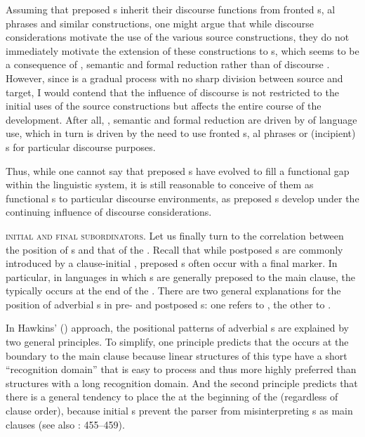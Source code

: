 \documentclass[output=paper]{langsci/langscibook}
\begin{document}
Assuming that preposed s inherit their discourse functions from fronted s, al phrases and similar constructions, one might argue that while discourse considerations motivate the use of the various source constructions, they do not immediately motivate the extension of these constructions to s, which 
\label{p:xxx:automatization}
seems to be a consequence of , semantic  and formal reduction rather than of discourse . However, since  is a gradual process with no sharp division between source and target, I would contend that the influence of discourse is not restricted to the initial uses of the source constructions but affects the entire course of the development. After all, , semantic  and formal reduction are driven by  of language use, which in turn is driven by the need to use fronted s, al phrases or (incipient) s for particular discourse purposes.

Thus, while one cannot say that preposed s have evolved to fill a functional gap within the linguistic system, it is still reasonable to conceive of them as functional s to particular discourse environments, as preposed s develop under the continuing influence of discourse considerations.

\textsc{initial} \textsc{and} \textsc{final} \textsc{subordinators}. Let us finally turn to the correlation between the position of s and that of the . Recall that while postposed s are commonly introduced by a clause-initial , preposed s often occur with a final marker. In particular, in languages in which s are generally preposed to the main clause, the  typically occurs at the end of the . There are two general explanations for the position of adverbial s in pre- and postposed s: one refers to , the other to .


In Hawkins’ (\citeyear{Hawkins1994,Hawkins2004})  approach, the positional patterns of adverbial s are explained by two general principles. To simplify, one principle predicts that the  occurs at the boundary to the main clause because linear structures of this type have a short “recognition domain” that is easy to process and thus more highly preferred than structures with a long recognition domain. And the second principle predicts that there is a general tendency to place the  at the beginning of the  (regardless of clause order), because initial s prevent the parser from misinterpreting s as main clauses (see also \citealt{Diessel2005}: 455--459).
\end{document}
